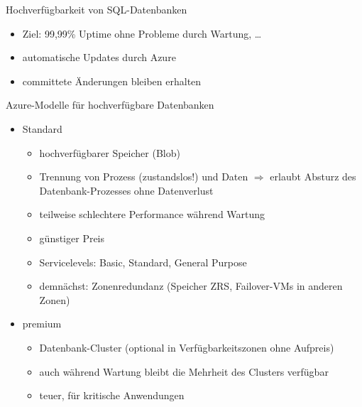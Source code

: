 \begin{flashcard}[]{Hochverfügbarkeit von SQL-Datenbanken}
  \begin{itemize}
    \item Ziel: 99,99\% Uptime ohne Probleme durch Wartung, \ldots
    \item automatische Updates durch Azure
    \item committete Änderungen bleiben erhalten
  \end{itemize}
\end{flashcard}

\begin{flashcard}[]{Azure-Modelle für hochverfügbare Datenbanken}
  \begin{itemize}
    \item Standard
      \begin{itemize}
        \item hochverfügbarer Speicher (Blob)
        \item Trennung von Prozess (zustandslos!) und Daten\newline
          $\Rightarrow$ erlaubt Absturz des Datenbank-Prozesses ohne Datenverlust
        \item teilweise schlechtere Performance während Wartung
        \item günstiger Preis
        \item Servicelevels: Basic, Standard, General Purpose
        \item demnächst: Zonenredundanz (Speicher ZRS, Failover-VMs in anderen Zonen)
      \end{itemize}
    \item premium
      \begin{itemize}
        \item Datenbank-Cluster (optional in Verfügbarkeitszonen ohne Aufpreis)
        \item auch während Wartung bleibt die Mehrheit des Clusters verfügbar
        \item teuer, für kritische Anwendungen
      \end{itemize}
  \end{itemize}
\end{flashcard}

